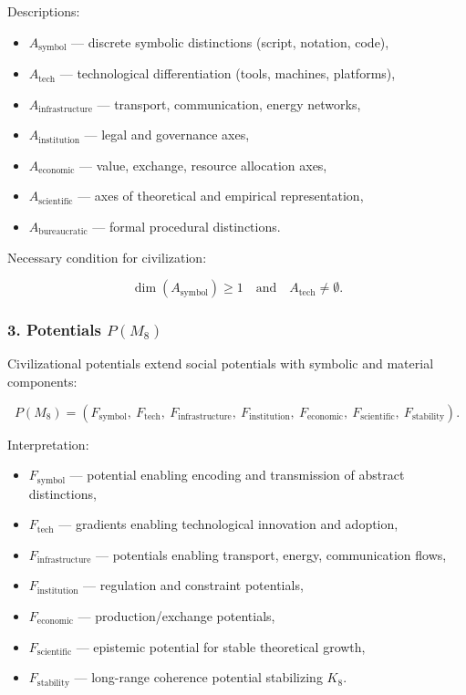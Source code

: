 Descriptions:

\begin{itemize}
    \item $A_{\mathrm{symbol}}$ — discrete symbolic distinctions (script, notation, code),
    \item $A_{\mathrm{tech}}$ — technological differentiation (tools, machines, platforms),
    \item $A_{\mathrm{infrastructure}}$ — transport, communication, energy networks,
    \item $A_{\mathrm{institution}}$ — legal and governance axes,
    \item $A_{\mathrm{economic}}$ — value, exchange, resource allocation axes,
    \item $A_{\mathrm{scientific}}$ — axes of theoretical and empirical representation,
    \item $A_{\mathrm{bureaucratic}}$ — formal procedural distinctions.
\end{itemize}

Necessary condition for civilization:

\[
\dim(A_{\mathrm{symbol}}) \ge 1
\quad\text{and}\quad
A_{\mathrm{tech}}\neq\emptyset.
\]

\subsubsection*{3. Potentials \texorpdfstring{$P(M_8)$}{P(M_8)}}

Civilizational potentials extend social potentials with symbolic and material components:

\[
P(M_8)=
(F_{\mathrm{symbol}},\
F_{\mathrm{tech}},\
F_{\mathrm{infrastructure}},\
F_{\mathrm{institution}},\
F_{\mathrm{economic}},\
F_{\mathrm{scientific}},\
F_{\mathrm{stability}}).
\]

Interpretation:

\begin{itemize}
    \item $F_{\mathrm{symbol}}$ — potential enabling encoding and transmission of abstract distinctions,
    \item $F_{\mathrm{tech}}$ — gradients enabling technological innovation and adoption,
    \item $F_{\mathrm{infrastructure}}$ — potentials enabling transport, energy, communication flows,
    \item $F_{\mathrm{institution}}$ — regulation and constraint potentials,
    \item $F_{\mathrm{economic}}$ — production/exchange potentials,
    \item $F_{\mathrm{scientific}}$ — epistemic potential for stable theoretical growth,
    \item $F_{\mathrm{stability}}$ — long-range coherence potential stabilizing $K_8$.
\end{itemize}

